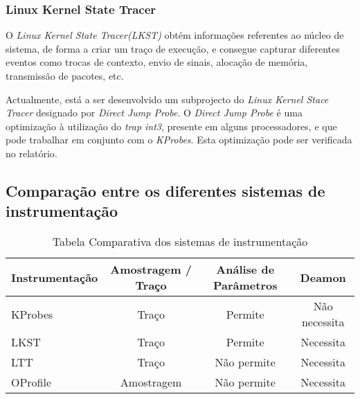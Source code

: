 \subsubsection{Linux Kernel State Tracer}

O \textit{Linux Kernel State Tracer(LKST)} obtém informações referentes ao núcleo de sistema, de forma a criar um traço de execução, e consegue capturar diferentes eventos como trocas de contexto, envio de sinais, alocação de memória, transmissão de pacotes, etc.

\label{cap:djprobe}
Actualmente, está a ser desenvolvido um subprojecto do \textit{Linux Kernel Stace Tracer} designado por \textit{Direct Jump Probe}.
O \textit{Direct Jump Probe} é uma optimização à utilização do \textit{trap int3}, presente em alguns processadores, e que pode trabalhar em conjunto com o \textit{KProbes}.
Esta optimização pode ser verificada no relatório\cite{Hiramatsu2005}.


\subsection{Comparação entre os diferentes sistemas de instrumentação}
\begin{table}[h!]
\begin{center}
\caption{Tabela Comparativa dos sistemas de instrumentação}
\label{tab:inst_compare}
\begin{tabular}{|l||c|c|c|}
\hline
Instrumentação & Amostragem / Traço & Análise de Parâmetros & Deamon \\
\hline
KProbes & Traço & Permite & Não necessita \\
\hline
LKST & Traço & Permite & Necessita \\
\hline
LTT & Traço & Não permite & Necessita \\
\hline
OProfile & Amostragem & Não permite & Necessita \\
\hline

\end{tabular}
\end{center}
\end{table}

